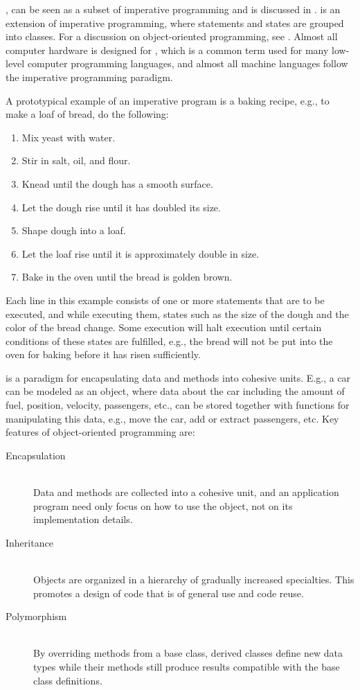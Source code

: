 \documentclass[fsharpNotes.tex]{subfiles}
\begin{document}
, can be seen as a subset of imperative programming and is discussed in .  is an extension of imperative programming, where statements and states are grouped into classes. For a discussion on object-oriented programming, see . Almost all computer hardware is designed for , which is a common term used for many low-level computer programming languages, and almost all machine languages follow the imperative programming paradigm. 

A prototypical example of an imperative program is a baking recipe, e.g., to make a loaf of bread, do the following:
\begin{enumerate}
\item Mix yeast with water.
\item Stir in salt, oil, and flour.
\item Knead until the dough has a smooth surface.
\item Let the dough rise until it has doubled its size.
\item Shape dough into a loaf.
\item Let the loaf rise until it is approximately double in size.
\item Bake in the oven until the bread is golden brown.
\end{enumerate}
Each line in this example consists of one or more statements that are to be executed, and while executing them, states such as the size of the dough and the color of the bread change. Some execution will halt execution until certain conditions of these states are fulfilled, e.g., the bread will not be put into the oven for baking before it has risen sufficiently.

 is a paradigm for encapsulating data and methods into cohesive units. E.g., a car can be modeled as an object, where data about the car including the amount of fuel, position, velocity, passengers, etc., can be stored together with functions for manipulating this data, e.g., move the car, add or extract passengers, etc. Key features of object-oriented programming are:
\begin{description}
\item[Encapsulation]~\\
  Data and methods are collected into a cohesive unit, and an application program need only focus on how to use the object, not on its implementation details.
\item[Inheritance]~\\
  Objects are organized in a hierarchy of gradually increased specialties. This promotes a design of code that is of general use and code reuse.
\item[Polymorphism]~\\
  By overriding methods from a base class, derived classes define new data types while their methods still produce results compatible with the base class definitions.
\end{description}
\end{document}
